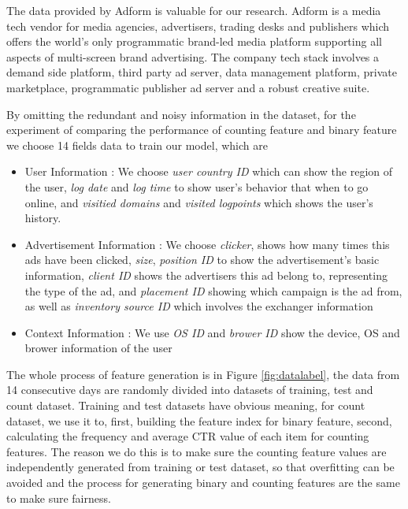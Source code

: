The data provided by Adform is valuable for our research. Adform is a media tech vendor for media agencies, advertisers, trading desks and publishers which offers the world’s only programmatic brand-led media platform supporting all aspects of multi-screen brand advertising. The company tech stack involves a demand side platform, third party ad server, data management platform, private marketplace, programmatic publisher ad server and a robust creative suite. 

By omitting the redundant and noisy information in the dataset, for the experiment of comparing the performance of counting feature and binary feature we choose 14 fields data to train our model, which are 
\begin{itemize}
\item User Information : We choose \textit{user country ID} which can show the region of the user, \textit{log date} and \textit{log time} to show user's behavior that when to go online, and \textit{visitied domains} and \textit{visited logpoints} which shows the user's history.
\item Advertisement Information : We choose \textit{clicker}, shows how many times this ads have been clicked, \textit{size}, \textit{position ID} to show the advertisement's basic information, \textit{client ID} shows the advertisers this ad belong to, representing the type of the ad, and \textit{placement ID} showing which campaign is the ad from, as well as \textit{inventory source ID} which involves the exchanger information
\item Context Information : We use  \textit{OS ID} and \textit{brower ID} show the device, OS and brower information of the user
\end{itemize}

The whole process of feature generation is in Figure \ref{fig:datalabel}, the data from 14 consecutive days are randomly divided into datasets of training, test and count dataset. Training and test datasets have obvious meaning, for count dataset, we use it to, first, building the feature index for binary feature, second, calculating the frequency and average CTR value of each item for counting features. The reason we do this is to make sure the counting feature values are independently generated from training or test dataset, so that overfitting can be avoided and the process for generating binary and counting features are the same to make sure fairness.

